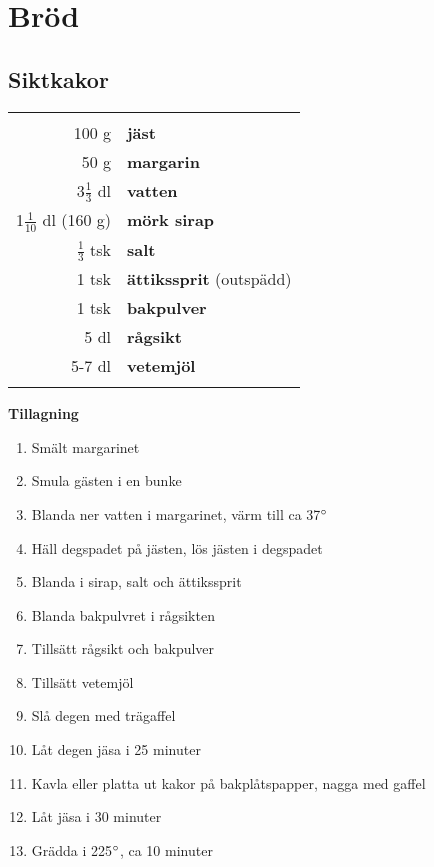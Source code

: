 
\section{Bröd}

\clearpage

\subsection{Siktkakor}

\begin{table}[H]
	\begin{tabular}{rl}
	\hline
	&\\
		100 g & \textbf{jäst}\\
		50 g & \textbf{margarin}\\
		3$\frac{1}{3}$ dl & \textbf{vatten} \\
		1$\frac{1}{10}$ dl (160 g) & \textbf{mörk sirap}\\
		$\frac{1}{3}$ tsk & \textbf{salt}\\
		1 tsk & \textbf{ättikssprit} (outspädd)\\
		1 tsk & \textbf{bakpulver}\\
		5 dl & \textbf{rågsikt}\\
		5-7 dl & \textbf{vetemjöl}\\
		&\\
	\hline
	\end{tabular}
\end{table}

\begin{multicols*}{2}

\noindent \textbf{Tillagning}
\begin{enumerate}
	\itemsep0cm
	\item Smält margarinet
	\item Smula gästen i en bunke
	\item Blanda ner vatten i margarinet, värm till ca 37$\degree$
	\item Häll degspadet på jästen, lös jästen i degspadet
	\item	Blanda i sirap, salt och ättikssprit
	\item Blanda bakpulvret i rågsikten
	\item Tillsätt rågsikt och bakpulver
	\item Tillsätt vetemjöl
	\item Slå degen med trägaffel
	\item Låt degen jäsa i 25 minuter
	\item Kavla eller platta ut kakor på bakplåtspapper, nagga med gaffel
	\item Låt jäsa i 30 minuter
	\item Grädda i 225$\degree$, ca 10 minuter
\end{enumerate}

\clearpage

\end{multicols*}